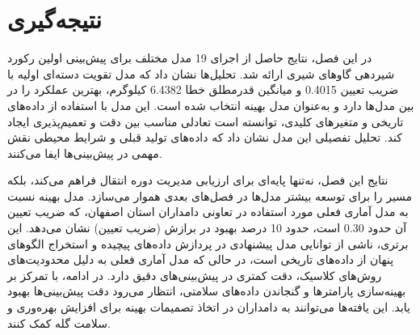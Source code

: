 \section{نتیجه‌گیری}

در این فصل، نتایج حاصل از اجرای 19 مدل مختلف برای پیش‌بینی اولین رکورد شیردهی گاوهای شیری ارائه شد. تحلیل‌ها نشان داد که مدل تقویت دسته‌ای اولیه با ضریب تعیین \num{0.4015} و میانگین قدرمطلق خطا \num{6.4382} کیلوگرم، بهترین عملکرد را در بین مدل‌ها دارد و به‌عنوان مدل بهینه انتخاب شده است. این مدل با استفاده از داده‌های تاریخی و متغیرهای کلیدی، توانسته است تعادلی مناسب بین دقت و تعمیم‌پذیری ایجاد کند. تحلیل تفصیلی این مدل نشان داد که داده‌های تولید قبلی و شرایط محیطی نقش مهمی در پیش‌بینی‌ها ایفا می‌کنند.

نتایج این فصل، نه‌تنها پایه‌ای برای ارزیابی مدیریت دوره انتقال فراهم می‌کند، بلکه مسیر را برای توسعه بیشتر مدل‌ها در فصل‌های بعدی هموار می‌سازد. مدل بهینه نسبت به مدل آماری فعلی مورد استفاده در تعاونی دامداران استان اصفهان، که ضریب تعیین آن حدود \num{0.30} است، حدود 10 درصد بهبود در برازش (ضریب تعیین) نشان می‌دهد. این برتری، ناشی از توانایی مدل پیشنهادی در پردازش داده‌های پیچیده و استخراج الگوهای پنهان از داده‌های تاریخی است، در حالی که مدل آماری فعلی به دلیل محدودیت‌های روش‌های کلاسیک، دقت کمتری در پیش‌بینی‌های دقیق دارد. در ادامه، با تمرکز بر بهینه‌سازی پارامترها و گنجاندن داده‌های سلامتی، انتظار می‌رود دقت پیش‌بینی‌ها بهبود یابد. این یافته‌ها می‌توانند به دامداران در اتخاذ تصمیمات بهینه برای افزایش بهره‌وری و سلامت گله کمک کنند.
